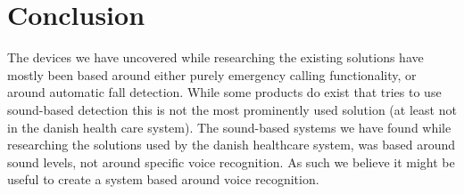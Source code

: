 \section{Conclusion}
The devices we have uncovered while researching the existing solutions have mostly been based around either purely emergency calling functionality, or around automatic fall detection. While some products do exist that tries to use sound-based detection this is not the most prominently used solution (at least not in the danish health care system). The sound-based systems we have found while researching the solutions used by the danish healthcare system, was based around sound levels, not around specific voice recognition. As such we believe it might be useful to create a system based around voice recognition.

